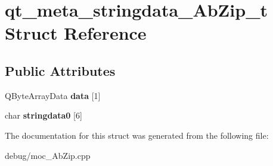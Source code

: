 \hypertarget{structqt__meta__stringdata___ab_zip__t}{}\section{qt\+\_\+meta\+\_\+stringdata\+\_\+\+Ab\+Zip\+\_\+t Struct Reference}
\label{structqt__meta__stringdata___ab_zip__t}
\subsection*{Public Attributes}
\begin{DoxyCompactItemize}
\item 
Q\+Byte\+Array\+Data {\bfseries data} \mbox{[}1\mbox{]}\hypertarget{structqt__meta__stringdata___ab_zip__t_a5f5845605a7f3047925322c5dcb82445}{}\label{structqt__meta__stringdata___ab_zip__t_a5f5845605a7f3047925322c5dcb82445}

\item 
char {\bfseries stringdata0} \mbox{[}6\mbox{]}\hypertarget{structqt__meta__stringdata___ab_zip__t_abbe332e5717c2a6486550661611df16b}{}\label{structqt__meta__stringdata___ab_zip__t_abbe332e5717c2a6486550661611df16b}

\end{DoxyCompactItemize}


The documentation for this struct was generated from the following file\+:\begin{DoxyCompactItemize}
\item 
debug/moc\+\_\+\+Ab\+Zip.\+cpp\end{DoxyCompactItemize}
